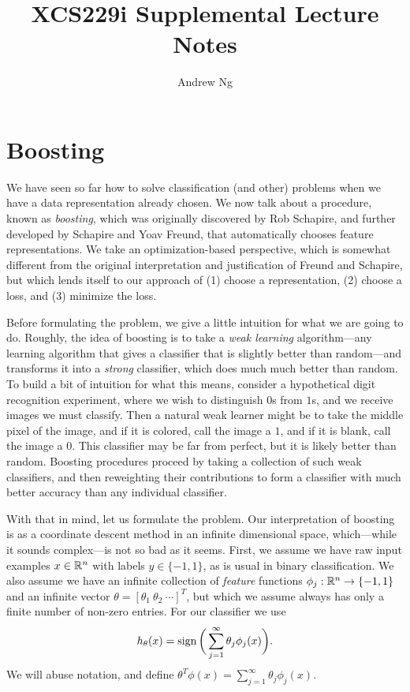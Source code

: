 \documentclass{article}
\newcommand{\represent}{\phi}
\begin{document}
\title{XCS229i Supplemental Lecture Notes}
\author{Andrew Ng}
\date{}
\maketitle

\section{Boosting}

We have seen so far how to solve classification (and other) problems when we
have a data representation already chosen. We now talk about a procedure,
known as \emph{boosting}, which was originally discovered by Rob Schapire,
and further developed by Schapire and Yoav Freund, that automatically
chooses feature representations. We take an optimization-based perspective,
which is somewhat different from the original interpretation and
justification of Freund and Schapire, but which lends itself to our approach
of (1) choose a representation, (2) choose a loss, and (3) minimize the
loss.

Before formulating the problem, we give a little intuition for what we are
going to do. Roughly, the idea of boosting is to take a \emph{weak learning}
algorithm---any learning algorithm that gives a classifier that is slightly
better than random---and transforms it into a \emph{strong} classifier,
which does much much better than random. To build a bit of intuition for
what this means, consider a hypothetical digit recognition experiment, where
we wish to distinguish $0$s from $1$s, and we receive images we must
classify. Then a natural weak learner might be to take the middle pixel of
the image, and if it is colored, call the image a $1$, and if it is blank,
call the image a $0$. This classifier may be far from perfect, but it is
likely better than random. Boosting procedures proceed by taking a
collection of such weak classifiers, and then reweighting their
contributions to form a classifier with much better accuracy than any
individual classifier.

With that in mind, let us formulate the problem. Our interpretation of
boosting is as a coordinate descent method in an infinite dimensional space,
which---while it sounds complex---is not so bad as it seems. First,
we assume we have raw input examples $x \in \mathbb{R}^n$ with labels $y \in \{-1,
1\}$, as is usual in binary classification. We also assume we have an
infinite collection of \emph{feature} functions $\represent_j : \R^n \to \{-1, 1\}$
and an infinite vector $\theta = [\theta_1 ~ \theta_2 ~ \cdots ]^T$, but
which we assume always has only a finite number of non-zero entries. For our
classifier we use
\begin{equation*}
  h_\theta(x) = \sign\bigg(\sum_{j = 1}^\infty \theta_j \represent_j(x) \bigg).
\end{equation*}
We will abuse notation, and define $\theta^T \represent(x) = \sum_{j = 1}^\infty
\theta_j \represent_j(x)$.
\end{document}

